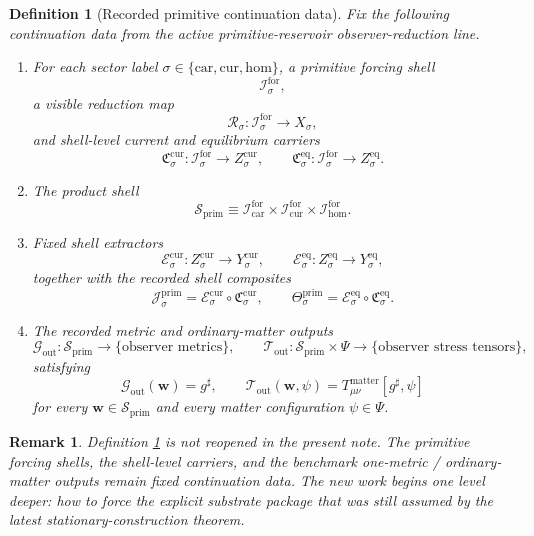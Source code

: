 \documentclass[11pt]{article}
\newcommand{\CompletedMetric}{g^{\sharp}}
\newcommand{\Car}{\mathrm{car}}
\newcommand{\Cur}{\mathrm{cur}}
\newcommand{\Hom}{\mathrm{hom}}
\newcommand{\ForSpace}[1]{\mathcal I_{#1}^{\mathrm{for}}}
\newcommand{\PrimShell}{\mathcal S_{\mathrm{prim}}}
\newcommand{\Reduction}[1]{\mathcal R_{#1}}
\newcommand{\CurrentCarrier}[1]{\mathfrak C_{#1}^{\mathrm{cur}}}
\newcommand{\EqCarrier}[1]{\mathfrak C_{#1}^{\mathrm{eq}}}
\newcommand{\CurrentExtract}[1]{\mathscr E_{#1}^{\mathrm{cur}}}
\newcommand{\EqExtract}[1]{\mathscr E_{#1}^{\mathrm{eq}}}
\newcommand{\PrimCurrent}[1]{\mathcal J_{#1}^{\mathrm{prim}}}
\newcommand{\PrimTheta}[1]{\Theta_{#1}^{\mathrm{prim}}}
\newcommand{\MetricOut}{\mathscr G_{\mathrm{out}}}
\newcommand{\MatterOut}{\mathscr T_{\mathrm{out}}}
\newtheorem{definition}{Definition}
\newtheorem{remark}{Remark}
\begin{document}
\begin{definition}[Recorded primitive continuation data]
\label{def:fixed}
Fix the following continuation data from the active primitive-reservoir observer-reduction line.
\begin{enumerate}
    \item For each sector label \(\sigma\in\{\Car,\Cur,\Hom\}\), a primitive forcing shell
    \[
    \ForSpace{\sigma},
    \]
    a visible reduction map
    \[
    \Reduction{\sigma}:\ForSpace{\sigma}\to X_{\sigma},
    \]
    and shell-level current and equilibrium carriers
    \[
    \CurrentCarrier{\sigma}:\ForSpace{\sigma}\to Z_{\sigma}^{\mathrm{cur}},
    \qquad
    \EqCarrier{\sigma}:\ForSpace{\sigma}\to Z_{\sigma}^{\mathrm{eq}}.
    \]
    \item The product shell
    \[
    \PrimShell
    \equiv
    \ForSpace{\Car}\times \ForSpace{\Cur}\times \ForSpace{\Hom}.
    \]
    \item Fixed shell extractors
    \[
    \CurrentExtract{\sigma}:Z_{\sigma}^{\mathrm{cur}}\to Y_{\sigma}^{\mathrm{cur}},
    \qquad
    \EqExtract{\sigma}:Z_{\sigma}^{\mathrm{eq}}\to Y_{\sigma}^{\mathrm{eq}},
    \]
    together with the recorded shell composites
    \begin{equation}
    \PrimCurrent{\sigma}
    =
    \CurrentExtract{\sigma}\circ \CurrentCarrier{\sigma},
    \qquad
    \PrimTheta{\sigma}
    =
    \EqExtract{\sigma}\circ \EqCarrier{\sigma}.
    \label{eq:primcomposites}
    \end{equation}
    \item The recorded metric and ordinary-matter outputs
    \[
    \MetricOut:\PrimShell\to\{\text{observer metrics}\},
    \qquad
    \MatterOut:\PrimShell\times\Psi\to\{\text{observer stress tensors}\},
    \]
    satisfying
    \begin{equation}
    \MetricOut(\mathbf w)=\CompletedMetric,
    \qquad
    \MatterOut(\mathbf w,\psi)
    =
    T_{\mu\nu}^{\mathrm{matter}}[\CompletedMetric,\psi]
    \label{eq:fixedoutputs}
    \end{equation}
    for every \(\mathbf w\in\PrimShell\) and every matter configuration \(\psi\in\Psi\).
\end{enumerate}
\end{definition}

\begin{remark}
Definition \ref{def:fixed} is not reopened in the present note. The primitive forcing shells, the shell-level carriers, and the benchmark one-metric / ordinary-matter outputs remain fixed continuation data. The new work begins one level deeper: how to force the explicit substrate package that was still assumed by the latest stationary-construction theorem.
\end{remark}
\end{document}
